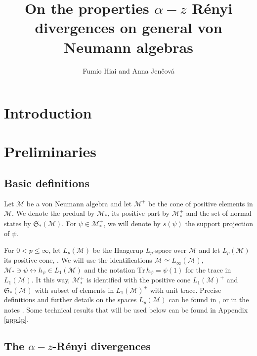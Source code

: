 \documentclass[12pt]{article}
\title{On the properties $\alpha-z$ R\'enyi divergences on general von Neumann algebras}
\author{Fumio Hiai and Anna Jen\v cov\'a}
\theoremstyle{definition}
\theoremstyle{remark}
\numberwithin{equation}{section}
\def\Me{\mathcal M}
\def \Tr{\mathrm{Tr}\,}
\def\states {\mathfrak S}
\begin{document}
\maketitle


\section{Introduction}

\section{Preliminaries}

\subsection{Basic definitions}

Let $\Me$ be a von Neumann algebra  and let $\Me^+$ be the cone of positive elements in $\Me$. We denote the predual by $\Me_*$, its positive part by $\Me_*^+$ and the set of normal states by $\states_*(\Me)$. For $\psi\in \Me_*^+$, we will denote by $s(\psi)$ the support projection  of $\psi$.

For $0< p\le \infty$, let $L_p(\Me)$ be the Haagerup $L_p$-space over $\Me$ and let
$L_p(\Me)$ its positive cone, 
\cite{haagerup1979lpspaces}. We will use the identifications $\Me\simeq L_\infty(\Me)$, $\Me_*\ni \psi \leftrightarrow h_\psi\in L_1(\Me)$ and the notation $\Tr h_\psi=\psi(1)$ for the trace in $L_1(\Me)$. It this way,
 $\Me_*^+$  is identified with the positive cone $L_1(\Me)^+$ and $\states_*(\Me)$ with subset of elements in $L_1(\Me)^+$ 
 with unit trace.  
Precise definitions and further details on the spaces $L_p(\Me)$ can be found in
\cite[Chap. 9]{hiai2021lectures}, or in the notes \cite{terp1981lpspaces}. 
Some technical results that will be used below can be found in Appendix \ref{app:lp}.
 





\subsection{The $\alpha-z$-R\'enyi divergences}
\end{document}
